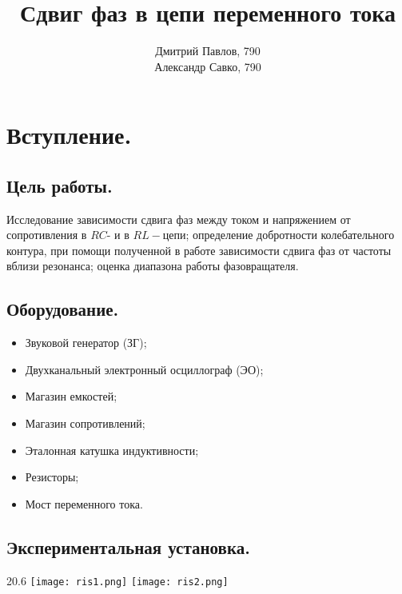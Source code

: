\documentclass[12pt,a4paper]{article}
\author{Дмитрий Павлов, 790 \\  Александр Савко, 790}
\title {\textbf{Сдвиг фаз в цепи переменного тока}}
\begin{document}
\maketitle
\newpage
\tableofcontents 

\newpage

\section{Вступление.}
    \subsection{Цель работы.}
        Исследование зависимости сдвига фаз между током и напряжением от сопротивления в $RC$- и в $RL-$цепи; определение добротности колебательного контура, при помощи полученной в работе зависимости сдвига фаз от частоты вблизи резонанса; оценка диапазона работы фазовращателя.
        
    \subsection{Оборудование.}
        \begin{itemize}
            \item Звуковой генератор (ЗГ);
            \item Двухканальный электронный осциллограф (ЭО);
            \item Магазин емкостей;
            \item Магазин сопротивлений;
            \item Эталонная катушка индуктивности;
            \item Резисторы;
            \item Мост переменного тока.
        \end{itemize}

    \subsection{Экспериментальная установка.}
        \begin{wrapfigure}{2}{0.6\linewidth}
        	\texttt{[image: ris1.png]}
        	\hspace{44pt}{Рисунок 1 -- Схема для исследования сдвига фаз между током и напряжением в цепи переменного тока.}
        	\texttt{[image: ris2.png]}
        	\hspace{44pt}{Рисунок 2 -- Схема фазовращателя.}
        \end{wrapfigure}
        
\end{document}
